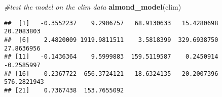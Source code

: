 \documentclass[
]{article}
\newenvironment{Shaded}{\begin{snugshade}}{\end{snugshade}}
\newcommand{\CommentTok}[1]{\textcolor[rgb]{0.56,0.35,0.01}{\textit{#1}}}
\newcommand{\DataTypeTok}[1]{\textcolor[rgb]{0.13,0.29,0.53}{#1}}
\newcommand{\FloatTok}[1]{\textcolor[rgb]{0.00,0.00,0.81}{#1}}
\newcommand{\KeywordTok}[1]{\textcolor[rgb]{0.13,0.29,0.53}{\textbf{#1}}}
\newcommand{\NormalTok}[1]{#1}
\newcommand{\OperatorTok}[1]{\textcolor[rgb]{0.81,0.36,0.00}{\textbf{#1}}}
\newcommand{\StringTok}[1]{\textcolor[rgb]{0.31,0.60,0.02}{#1}}
\begin{document}
\begin{Shaded}
\end{Shaded}

\begin{Shaded}
\begin{Highlighting}[]
\CommentTok{#test the model on the clim data}
\KeywordTok{almond_model}\NormalTok{(clim)}
\end{Highlighting}
\end{Shaded}

\begin{verbatim}
##  [1]   -0.3552237    9.2906757   68.9130633   15.4280698   20.2083803
##  [6]    2.4820009 1919.9811511    3.5818399  329.6938750   27.8636956
## [11]   -0.1436364    9.5999883  159.5119587    0.2450914   -0.2585997
## [16]   -0.2367722  656.3724121   18.6324135   20.2007396  576.2821943
## [21]    0.7367438  153.7655092
\end{verbatim}
\end{document}
